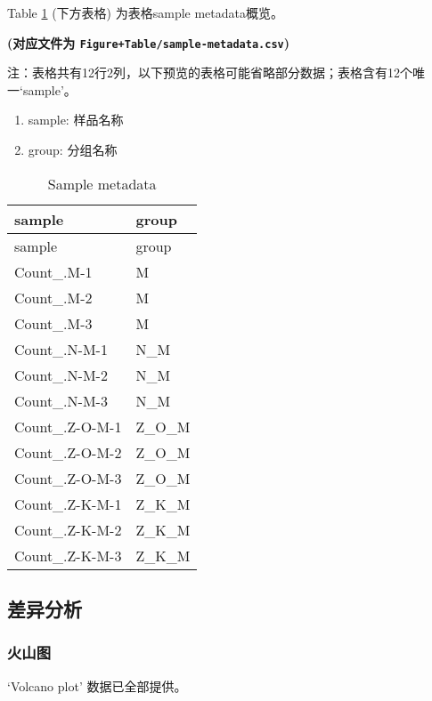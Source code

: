 \documentclass[
]{article}
\providecommand{\tightlist}{%
  \setlength{\itemsep}{0pt}\setlength{\parskip}{0pt}}
\begin{document}
Table \ref{tab:sample-metadata} (下方表格) 为表格sample metadata概览。

\textbf{(对应文件为 \texttt{Figure+Table/sample-metadata.csv})}

\begin{center}\begin{tcolorbox}[colback=gray!10, colframe=gray!50, width=0.9\linewidth, arc=1mm, boxrule=0.5pt]注：表格共有12行2列，以下预览的表格可能省略部分数据；表格含有12个唯一`sample'。
\end{tcolorbox}
\end{center}
\begin{center}\begin{tcolorbox}[colback=gray!10, colframe=gray!50, width=0.9\linewidth, arc=1mm, boxrule=0.5pt]\begin{enumerate}\tightlist
\item sample: 样品名称
\item group: 分组名称
\end{enumerate}\end{tcolorbox}
\end{center}

\begin{longtable}[]{@{}ll@{}}
\caption{\label{tab:sample-metadata}Sample metadata}\tabularnewline
\toprule
sample & group\tabularnewline
\midrule
\endfirsthead
\toprule
sample & group\tabularnewline
\midrule
\endhead
Count\_.M-1 & M\tabularnewline
Count\_.M-2 & M\tabularnewline
Count\_.M-3 & M\tabularnewline
Count\_.N-M-1 & N\_M\tabularnewline
Count\_.N-M-2 & N\_M\tabularnewline
Count\_.N-M-3 & N\_M\tabularnewline
Count\_.Z-O-M-1 & Z\_O\_M\tabularnewline
Count\_.Z-O-M-2 & Z\_O\_M\tabularnewline
Count\_.Z-O-M-3 & Z\_O\_M\tabularnewline
Count\_.Z-K-M-1 & Z\_K\_M\tabularnewline
Count\_.Z-K-M-2 & Z\_K\_M\tabularnewline
Count\_.Z-K-M-3 & Z\_K\_M\tabularnewline
\bottomrule
\end{longtable}

\hypertarget{all}{%
\subsection{差异分析}\label{all}}

\hypertarget{ux706bux5c71ux56fe}{%
\subsubsection{火山图}\label{ux706bux5c71ux56fe}}

`Volcano plot' 数据已全部提供。
\end{document}
